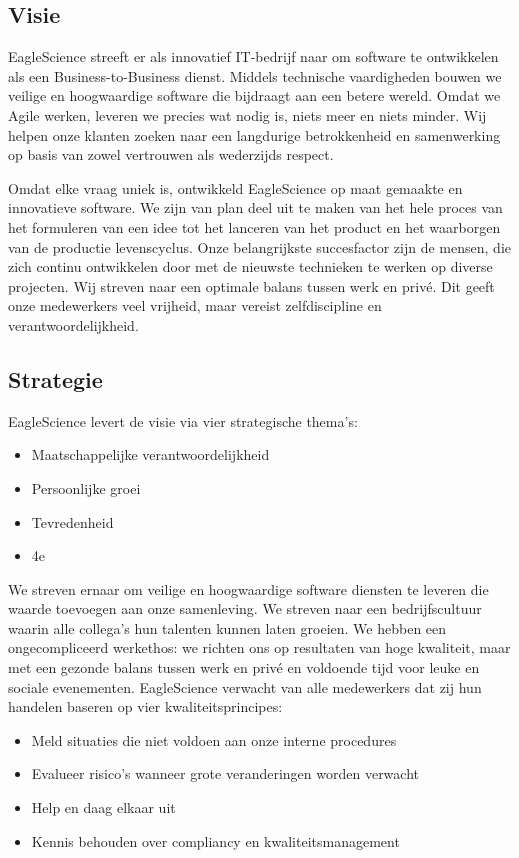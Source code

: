 \subsection{Visie}\label{subsec:visie}
EagleScience streeft er als innovatief IT-bedrijf naar om software te ontwikkelen als een Business-to-Business dienst. Middels technische vaardigheden bouwen we veilige en hoogwaardige software die bijdraagt aan een betere wereld. Omdat we Agile werken, leveren we precies wat nodig is, niets meer en niets minder. Wij helpen onze klanten zoeken naar een langdurige betrokkenheid en samenwerking op basis van zowel vertrouwen als wederzijds respect.

Omdat elke vraag uniek is, ontwikkeld EagleScience op maat gemaakte en innovatieve software.  We zijn van plan deel uit te maken van het hele proces van het formuleren van een idee tot het lanceren van het product en het waarborgen van de productie levenscyclus. Onze belangrijkste succesfactor zijn de mensen, die zich continu ontwikkelen door met de nieuwste technieken te werken op diverse projecten. Wij streven naar een optimale balans tussen werk en privé. Dit geeft onze medewerkers veel vrijheid, maar vereist zelfdiscipline en verantwoordelijkheid.

\subsection{Strategie}\label{subsec:strategie}
EagleScience levert de visie via vier strategische thema's:
\begin{itemize}
    \item Maatschappelijke verantwoordelijkheid
    \item Persoonlijke groei
    \item Tevredenheid
    \item 4e %
\end{itemize}
We streven ernaar om veilige en hoogwaardige software diensten te leveren die waarde toevoegen aan onze samenleving. We streven naar een bedrijfscultuur waarin alle collega's hun talenten kunnen laten groeien. We hebben een ongecompliceerd werkethos: we richten ons op resultaten van hoge kwaliteit, maar met een gezonde balans tussen werk en privé en voldoende tijd voor leuke en sociale evenementen. EagleScience verwacht van alle medewerkers dat zij hun handelen baseren op vier kwaliteitsprincipes:
\begin{itemize}
    \item Meld situaties die niet voldoen aan onze interne procedures
    \item Evalueer risico's wanneer grote veranderingen worden verwacht
    \item Help en daag elkaar uit
    \item Kennis behouden over compliancy en kwaliteitsmanagement
\end{itemize}

